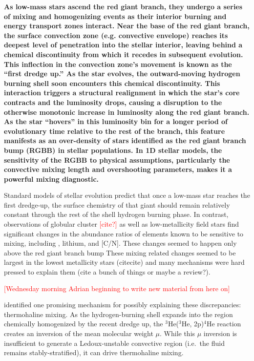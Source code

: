 \textbf{As low-mass stars ascend the red giant branch, they undergo a series of mixing and homogenizing events as their interior burning and energy transport zones interact. Near the base of the red giant branch, the surface convection zone (e.g. convective envelope) reaches its deepest level of penetration into the stellar interior, leaving behind a chemical discontinuity from which it recedes in subsequent evolution. This inflection in the convection zone's movement is known as the ``first dredge up.'' As the star evolves, the outward-moving hydrogen burning shell soon encounters this chemical discontinuity. This interaction triggers a structural realignment in which the star's core contracts and the luminosity drops, causing a disruption to the otherwise monotonic increase in luminosity along the red giant branch. As the star ``hovers'' in this luminosity bin for a longer period of evolutionary time relative to the rest of the branch, this feature manifests as an over-density of stars identified as the red giant branch bump (RGBB) in stellar populations. In 1D stellar models, the sensitivity of the RGBB to physical assumptions, particularly the convective mixing length and overshooting parameters, makes it a powerful mixing diagnostic.}

Standard models of stellar evolution predict that once a low-mass star reaches the first dredge-up,
the surface chemistry of that giant should remain relatively constant through the rest of the shell hydrogen burning phase. 
In contrast, observations of globular cluster \textcolor{red}{[cite?]} as well as low-metallicity field stars \citep{Gratton2000} find significant changes in the abundance ratios of elements known to be sensitive to mixing, including \ctwelvecthirteen, lithium, and [C/N]. 
These changes seemed to happen only above the red giant branch bump
These mixing related changes seemed to be largest in the lowest metallicity stars (citecite) and many mechanisms were hard pressed to explain them (cite a bunch of things or maybe a review?). 

\textcolor{red}{[Wednesday morning Adrian beginning to write new material from here on]}

\citet{charbonnel_thermohaline_2007} identified one promising mechanism for possibly explaining these discrepancies: thermohaline mixing. As the hydrogen-burning shell expands into the region chemically homogenized by the recent dredge up, the $^3$He($^3$He, 2p)$^4$He reaction creates an inversion of the mean molecular weight $\mu$. While this $\mu$ inversion is insufficient to generate a Ledoux-unstable convective region (i.e.~the fluid remains stably-stratified), it can drive thermohaline mixing. 

